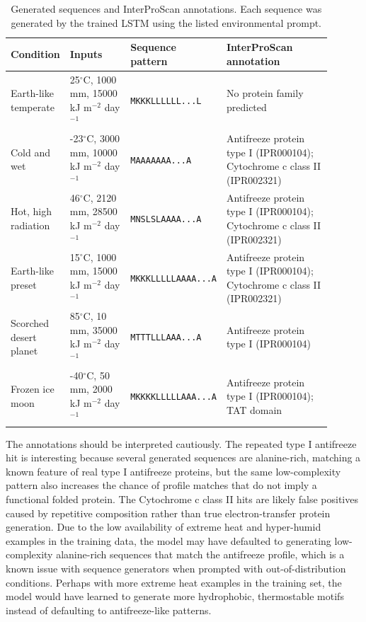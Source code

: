 \documentclass[11pt]{article}
\begin{document}
\begin{table}[H]
\centering
\small
\caption{Generated sequences and InterProScan annotations. Each sequence was
generated by the trained LSTM using the listed environmental prompt.}
\label{tab:generated-sequences}
\begin{tabular}{p{0.17\linewidth}p{0.19\linewidth}p{0.21\linewidth}p{0.33\linewidth}}
\toprule
Condition & Inputs & Sequence pattern & InterProScan annotation \\
\midrule
Earth-like temperate & 25$^\circ$C, 1000 mm, 15000 kJ m$^{-2}$ day$^{-1}$ &
\texttt{MKKKLLLLLL...L} & No protein family predicted \\
Cold and wet & -23$^\circ$C, 3000 mm, 10000 kJ m$^{-2}$ day$^{-1}$ &
\texttt{MAAAAAAA...A} & Antifreeze protein type I (IPR000104);
Cytochrome c class II (IPR002321) \\
Hot, high radiation & 46$^\circ$C, 2120 mm, 28500 kJ m$^{-2}$ day$^{-1}$ &
\texttt{MNSLSLAAAA...A} & Antifreeze protein type I (IPR000104);
Cytochrome c class II (IPR002321) \\
Earth-like preset & 15$^\circ$C, 1000 mm, 15000 kJ m$^{-2}$ day$^{-1}$ &
\texttt{MKKKLLLLLAAAA...A} & Antifreeze protein type I (IPR000104);
Cytochrome c class II (IPR002321) \\
Scorched desert planet & 85$^\circ$C, 10 mm, 35000 kJ m$^{-2}$ day$^{-1}$ &
\texttt{MTTTLLLAAA...A} & Antifreeze protein type I (IPR000104) \\
Frozen ice moon & -40$^\circ$C, 50 mm, 2000 kJ m$^{-2}$ day$^{-1}$ &
\texttt{MKKKKLLLLLAAA...A} & Antifreeze protein type I (IPR000104);
TAT domain \\
\bottomrule
\end{tabular}
\end{table}

The annotations should be interpreted cautiously. The repeated type I
antifreeze hit is interesting because several generated sequences are
alanine-rich, matching a known feature of real type I antifreeze proteins, but
the same low-complexity pattern also increases the chance of profile matches
that do not imply a functional folded protein. The Cytochrome c class II hits
are likely false positives caused by repetitive composition rather than true
electron-transfer protein generation.
Due to the low availability of extreme heat and hyper-humid examples in the training data, the model may have defaulted to generating low-complexity alanine-rich sequences that match the antifreeze profile, which is a known issue with sequence generators when prompted with out-of-distribution conditions. Perhaps with more extreme heat examples in the training set, the model would have learned to generate more hydrophobic, thermostable motifs instead of defaulting to antifreeze-like patterns.
\end{document}
